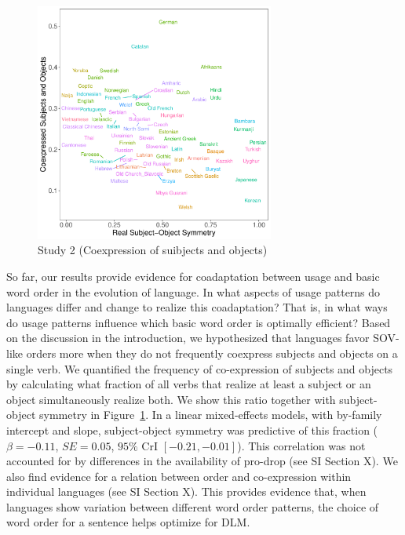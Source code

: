 \documentclass[11pt,a4paper]{article}
\begin{document}
\begin{figure}
    \centering
    \includegraphics[width=0.7\textwidth]{figures/objects-order-pureud-byVerb_FORMAT.pdf}
    \caption{Study 2 (Coexpression of suibjects and objects)}
    \label{fig:study2}
\end{figure}

So far, our results provide evidence for coadaptation between usage and basic word order in the evolution of language.
In what aspects of usage patterns do languages differ and change to realize this coadaptation?
That is, in what ways do usage patterns influence which basic word order is optimally efficient?
Based on the discussion in the introduction, we hypothesized that languages favor SOV-like orders more when they do not frequently coexpress subjects and objects on a single verb.
We quantified the frequency of co-expression of subjects and objects by calculating what fraction of all verbs that realize at least a subject or an object simultaneously realize both.
We show this ratio together with subject-object symmetry in Figure~\ref{fig:study2}.
In a linear mixed-effects models, with by-family intercept and slope, subject-object symmetry was predictive of this fraction ($\beta=-0.11$, $SE=0.05$, $95\%$ CrI $[-0.21, -0.01]$).
This correlation was not accounted for by differences in the availability of pro-drop (see SI Section X).
We also find evidence for a relation between order and co-expression within individual languages (see SI Section X). %
This provides evidence that, when languages show variation between different word order patterns, the choice of word order for a sentence helps optimize for DLM.
\end{document}
